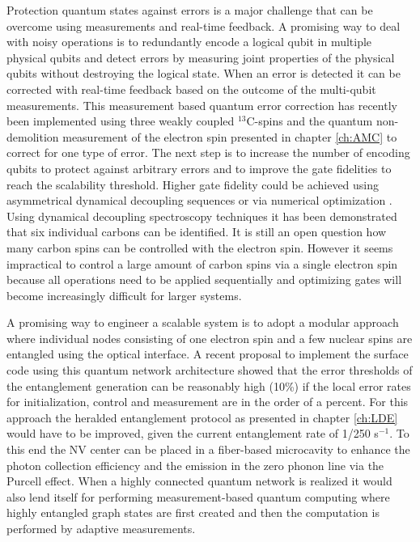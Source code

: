 Protection quantum states against errors is a major challenge that can be overcome using measurements and real-time feedback. A promising way to deal with noisy operations is to redundantly encode a logical qubit in multiple physical qubits and detect errors by measuring joint properties of the physical qubits without destroying the logical state. When an error is detected it can be corrected with real-time feedback based on the outcome of the multi-qubit measurements. This measurement based quantum error correction has recently been implemented using three weakly coupled $^{13}$C-spins and the quantum non-demolition measurement of the electron spin presented in chapter \ref{ch:AMC} to correct for one type of error\cite{Cramer_arXiv_2015}. The next step is to increase the number of encoding qubits to protect against arbitrary errors and to improve the gate fidelities to reach the scalability threshold. Higher gate fidelity could be achieved using asymmetrical dynamical decoupling sequences\cite{Casanova_arXiv_2015} or via numerical optimization \cite{Liu_NatCommun_2013,Dolde_NatCommun_2014}. Using dynamical decoupling spectroscopy techniques it has been demonstrated that six individual carbons can be identified\cite{Taminiau_Phys.Rev.Lett._2012}. It is still an open question how many carbon spins can be controlled with the electron spin. However it seems impractical to control a large amount of carbon spins via a single electron spin because all operations need to be applied sequentially and optimizing gates will become increasingly difficult for larger systems.

A promising way to engineer a scalable system is to adopt a modular approach where individual nodes consisting of one electron spin and a few nuclear spins are entangled using the optical interface. A recent proposal to implement the surface code using this quantum network architecture showed that the error thresholds of the entanglement generation can be reasonably high (10\%) if the local error rates for initialization, control and measurement are in the order of a percent\cite{Nickerson_NatCommun_2013}. For this approach the heralded entanglement protocol as presented in chapter \ref{ch:LDE} would have to be improved, given the current entanglement rate of 1/250 s$^{-1}$. To this end the NV center can be placed in a fiber-based microcavity to enhance the photon collection efficiency and the emission in the zero phonon line via the Purcell effect\cite{Kaupp_Phys.Rev.A_2013,Albrecht_Phys.Rev.Lett._2013,Janitz_arXiv_2015}. When a highly connected quantum network is realized it would also lend itself for performing measurement-based quantum computing\cite{Raussendorf_Phys.Rev.Lett._2001,Benjamin_Laser&Photon.Rev._2009} where highly entangled graph states are first created and then the computation is performed by adaptive measurements.

